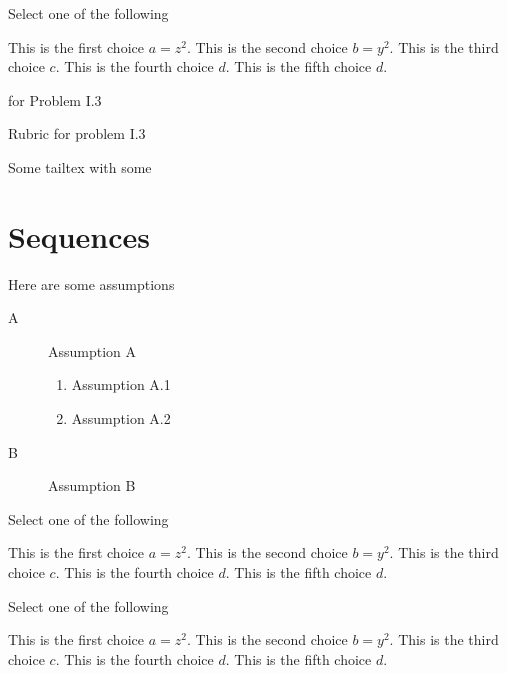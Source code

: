 \begin{mproblem}
\begin{problem}[40][Problem I.3]
\label{quiz-ii:2}
Select one of the following
\begin{xchoice}
\choice This is the first choice $a = z^2$.
\choice This is the second choice $b = y^2$.
\choice* This is the third choice $c$.
\choice* This is the fourth choice $d$.
\choice This is the fifth choice $d$.
\end{xchoice}

\help  for Problem I.3

\rubric
Rubric for problem I.3
\end{problem}

\end{mproblem}
Some tailtex with some \command


\section[50]{Sequences}
\label{sec:quiz-ii::middle}

\begin{gram}
Here are some assumptions
\begin{description}
\item[A] Assumption A
\begin{enumerate}
\item Assumption A.1
\item Assumption A.2
\end{enumerate}

\item[B] Assumption B
\end{description}
\end{gram}


\begin{problem}[70][Xchoice I]
Select one of the following
\begin{xchoice}
\choice This is the first choice $a = z^2$.
\choice This is the second choice $b = y^2$.
\choice* This is the third choice $c$.
\choice* This is the fourth choice $d$.
\choice This is the fifth choice $d$.
\end{xchoice}
\end{problem}

\begin{problem}[80][Xchoice I.2]
Select one of the following
\begin{xchoice}
\choice This is the first choice $a = z^2$.
\choice This is the second choice $b = y^2$.
\choice* This is the third choice $c$.
\choice* This is the fourth choice $d$.
\choice This is the fifth choice $d$.
\end{xchoice}
\end{problem}


